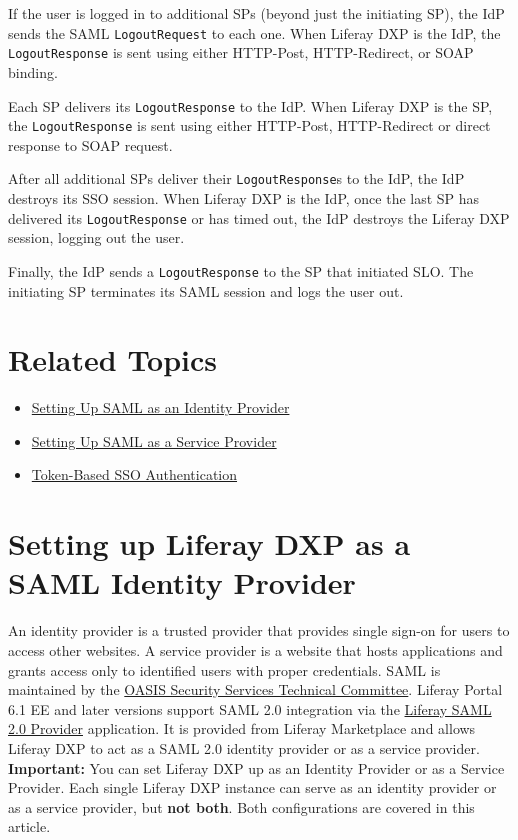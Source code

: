 If the user is logged in to additional SPs (beyond just the initiating
SP), the IdP sends the SAML \texttt{LogoutRequest} to each one. When
Liferay DXP is the IdP, the \texttt{LogoutResponse} is sent using either
HTTP-Post, HTTP-Redirect, or SOAP binding.

Each SP delivers its \texttt{LogoutResponse} to the IdP. When Liferay
DXP is the SP, the \texttt{LogoutResponse} is sent using either
HTTP-Post, HTTP-Redirect or direct response to SOAP request.

After all additional SPs deliver their \texttt{LogoutResponse}s to the
IdP, the IdP destroys its SSO session. When Liferay DXP is the IdP, once
the last SP has delivered its \texttt{LogoutResponse} or has timed out,
the IdP destroys the Liferay DXP session, logging out the user.

Finally, the IdP sends a \texttt{LogoutResponse} to the SP that
initiated SLO. The initiating SP terminates its SAML session and logs
the user out.

\section{Related Topics}\label{related-topics-3}

\begin{itemize}
\tightlist
\item
  \href{/docs/7-0/deploy/-/knowledge_base/d/setting-up-liferay-as-a-saml-identity-provider}{Setting
  Up SAML as an Identity Provider}
\item
  \href{/docs/7-0/deploy/-/knowledge_base/d/setting-up-liferay-as-a-saml-service-provider}{Setting
  Up SAML as a Service Provider}
\item
  \href{/docs/7-0/deploy/-/knowledge_base/d/token-based-single-sign-on-authentication}{Token-Based
  SSO Authentication}
\end{itemize}

\section{Setting up Liferay DXP as a SAML Identity
Provider}\label{setting-up-liferay-dxp-as-a-saml-identity-provider}

An identity provider is a trusted provider that provides single sign-on
for users to access other websites. A service provider is a website that
hosts applications and grants access only to identified users with
proper credentials. SAML is maintained by the
\href{https://www.oasis-open.org/\%20committees/security/}{OASIS
Security Services Technical Committee}. Liferay Portal 6.1 EE and later
versions support SAML 2.0 integration via the
\href{https://web.liferay.com/marketplace/-/mp/application/15188711}{Liferay
SAML 2.0 Provider} application. It is provided from Liferay Marketplace
and allows Liferay DXP to act as a SAML 2.0 identity provider or as a
service provider. \textbf{Important:} You can set Liferay DXP up as an
Identity Provider or as a Service Provider. Each single Liferay DXP
instance can serve as an identity provider or as a service provider, but
\textbf{not both}. Both configurations are covered in this article.

